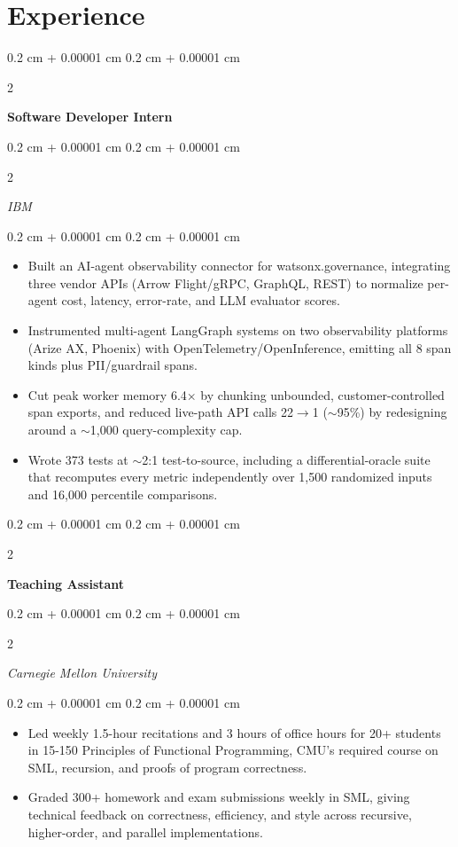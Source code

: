 \documentclass[10pt, letterpaper]{article}
\newenvironment{highlights}{
    \begin{itemize}[
        topsep=0.06 cm,
        parsep=0.06 cm,
        partopsep=0pt,
        itemsep=0pt,
        leftmargin=0.4 cm + 10pt
    ]
}{
    \end{itemize}
} %
\newenvironment{onecolentry}{
    \begin{adjustwidth}{
        0.2 cm + 0.00001 cm
    }{
        0.2 cm + 0.00001 cm
    }
}{
    \end{adjustwidth}
} %
\newenvironment{twocolentry}[2][]{
    \onecolentry
    \def\secondColumn{#2}
    \setcolumnwidth{\fill, 5 cm}
    \begin{paracol}{2}
}{
    \switchcolumn \raggedleft \secondColumn
    \end{paracol}
    \endonecolentry
} %
\begin{document}
    \section{Experience}
        \begin{twocolentry}{}
            \textbf{Software Developer Intern}
        \end{twocolentry}
        \begin{twocolentry}{}
            \textit{IBM}
        \end{twocolentry}
        \begin{onecolentry}
            \begin{highlights}
                \item Built an AI-agent observability connector for watsonx.governance, integrating three vendor APIs (Arrow Flight/gRPC, GraphQL, REST) to normalize per-agent cost, latency, error-rate, and LLM evaluator scores.
                \item Instrumented multi-agent LangGraph systems on two observability platforms (Arize AX, Phoenix) with OpenTelemetry/OpenInference, emitting all 8 span kinds plus PII/guardrail spans.
                \item Cut peak worker memory 6.4$\times$ by chunking unbounded, customer-controlled span exports, and reduced live-path API calls 22$\rightarrow$1 ($\sim$95\%) by redesigning around a $\sim$1,000 query-complexity cap.
                \item Wrote 373 tests at $\sim$2:1 test-to-source, including a differential-oracle suite that recomputes every metric independently over 1,500 randomized inputs and 16,000 percentile comparisons.
            \end{highlights}
        \end{onecolentry}
        \begin{twocolentry}{}
            \textbf{Teaching Assistant}
        \end{twocolentry}
        \begin{twocolentry}{}
            \textit{Carnegie Mellon University}
        \end{twocolentry}
        \vspace{0.06 cm}
        \begin{onecolentry}
            \begin{highlights}
                \item Led weekly 1.5-hour recitations and 3 hours of office hours for 20+ students in 15-150 Principles of Functional Programming, CMU's required course on SML, recursion, and proofs of program correctness.
                \item Graded 300+ homework and exam submissions weekly in SML, giving technical feedback on correctness, efficiency, and style across recursive, higher-order, and parallel implementations.
            \end{highlights}
        \end{onecolentry}
\end{document}
